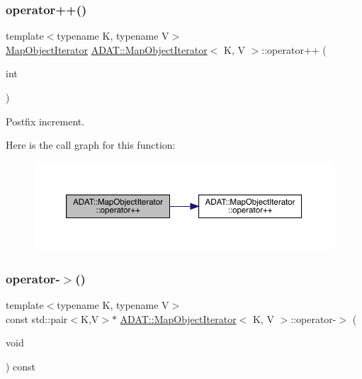 \subsubsection{\texorpdfstring{operator++()}{operator++()}\hspace{0.1cm}{\footnotesize\ttfamily [6/6]}}
{\footnotesize\ttfamily template$<$typename K, typename V$>$ \\
\mbox{\hyperlink{classADAT_1_1MapObjectIterator}{Map\+Object\+Iterator}} \mbox{\hyperlink{classADAT_1_1MapObjectIterator}{A\+D\+A\+T\+::\+Map\+Object\+Iterator}}$<$ K, V $>$\+::operator++ (\begin{DoxyParamCaption}\item[{int}]{ }\end{DoxyParamCaption})\hspace{0.3cm}{\ttfamily [inline]}}



Postfix increment. 

Here is the call graph for this function\+:
\nopagebreak
\begin{figure}[H]
\begin{center}
\leavevmode
\includegraphics[width=350pt]{d2/d4b/classADAT_1_1MapObjectIterator_a90809a5488988dd0d49ce25df35756ae_cgraph}
\end{center}
\end{figure}
\mbox{\label{classADAT_1_1MapObjectIterator_aa56a13020c9fac807f99312923610dbd}} 
\subsubsection{\texorpdfstring{operator-\/$>$()}{operator->()}\hspace{0.1cm}{\footnotesize\ttfamily [1/3]}}
{\footnotesize\ttfamily template$<$typename K, typename V$>$ \\
const std\+::pair$<$K,V$>$$\ast$ \mbox{\hyperlink{classADAT_1_1MapObjectIterator}{A\+D\+A\+T\+::\+Map\+Object\+Iterator}}$<$ K, V $>$\+::operator-\/$>$ (\begin{DoxyParamCaption}\item[{void}]{ }\end{DoxyParamCaption}) const\hspace{0.3cm}{\ttfamily [inline]}}

